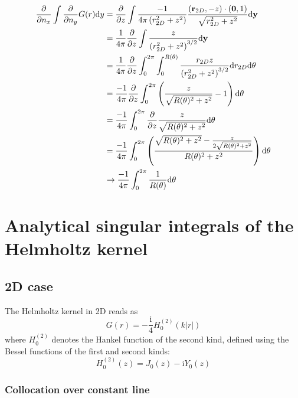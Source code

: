\documentclass[a4paper,11pt]{article}
\newcommand{\td}{\mathrm{d}}
\newcommand{\ti}{\mathrm{i}}
\begin{document}
\begin{align}
\frac{\partial}{\partial n_x}
\int
\frac{\partial}{\partial n_y}
G(r)
\td y
&=
\frac{\partial}{\partial z}
\int
\frac{-1}{4\pi \left(r^2_{2D} + z^2\right)}
\frac{({\bf r}_{2D},-z)\cdot({\bf 0},1)}{\sqrt{r^2_{2D} + z^2}}
\td {\bf y}
\nonumber \\
&=
\frac{1}{4\pi}
\frac{\partial}{\partial z}
\int
\frac{z}{\left(r^2_{2D} + z^2\right)^{3/2}}
\td {\bf y}
\nonumber \\
&=
\frac{1}{4\pi}
\frac{\partial}{\partial z}
\int_{0}^{2\pi}
\int_{0}^{R(\theta)}
\frac{r_{2D} z}{\left(r^2_{2D} + z^2\right)^{3/2}}
\td r_{2D}
\td \theta
\nonumber \\
&=
\frac{-1}{4\pi}
\frac{\partial}{\partial z}
\int_{0}^{2\pi}
\left(
\frac{z}{\sqrt{R(\theta)^2 + z^2}}
-
1
\right)
\td \theta
\nonumber \\
&=
\frac{-1}{4\pi}
\int_{0}^{2\pi}
\frac{\partial}{\partial z}
\frac{z}{\sqrt{R(\theta)^2 + z^2}}
\td \theta
\nonumber \\
&=
\frac{-1}{4\pi}
\int_{0}^{2\pi}
\left(
\frac{\sqrt{R(\theta)^2 + z^2} - \frac{z}{2\sqrt{R(\theta)^2 + z^2}}}{R(\theta)^2 + z^2}
\right)
\td \theta
\nonumber \\
&\to
\frac{-1}{4\pi}
\int_{0}^{2\pi}
\frac{1}{R(\theta)}
\td \theta
\end{align}


\section{Analytical singular integrals of the Helmholtz kernel}

\subsection{2D case}

The Helmholtz kernel in 2D reads as
%
\begin{equation}
G(r) = -\frac{\ti}{4}H^{(2)}_0(k|r|)
\end{equation}
%
where $H_0^{(2)}$ denotes the Hankel function of the second kind, defined using the Bessel functions of the first and second kinds:
%
\begin{equation}
H^{(2)}_0(z) = J_0(z) - \ti Y_0(z)
\end{equation}


\subsubsection{Collocation over constant line}
\end{document}
